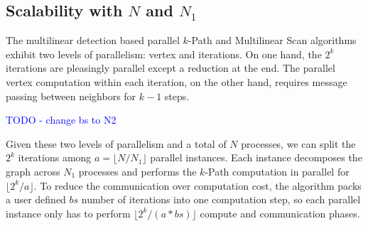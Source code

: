 


\subsection{Scalability with $N$ and $N_1$}
\label{sec:n1n}
The multilinear detection based parallel $k$-Path and Multilinear Scan algorithms exhibit two levels of parallelism: vertex and iterations. On one hand, the $2^k$ iterations are pleasingly parallel except a reduction at the end. The parallel vertex computation within each iteration, on the other hand, requires message passing between neighbors for $k-1$ steps. 

\textcolor{blue}{TODO - change bs to N2}

Given these two levels of parallelism and a total of $N$ processes, we can split the $2^k$ iterations among $a=\lfloor N/N_1 \rfloor$ parallel instances. Each instance decomposes the graph across $N_1$ processes and performs the $k$-Path computation in parallel for $\lfloor 2^k/a \rfloor$. To reduce the communication over computation cost, the algorithm packs a user defined $bs$ number of iterations into one computation step, so each parallel instance only has to perform $\lfloor 2^k/(a*bs) \rfloor$ compute and communication phases. 

